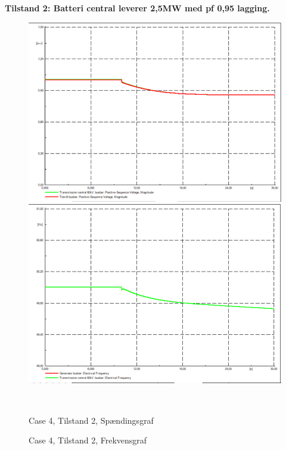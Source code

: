 \textbf{Tilstand 2: Batteri central leverer 2,5MW med pf 0,95 lagging.}
\begin{figure}[H]
	\centering
	\begin{minipage}[b]{0.48\textwidth}
		\centering
		\includegraphics[width=1.00\textwidth]{figurer/LargeDisturbanceBatterypark/Voltage2} %
	\end{minipage}
	\hfill
	\begin{minipage}[b]{0.48\textwidth}
		\centering
		\includegraphics[width=1.00\textwidth]{figurer/LargeDisturbanceBatterypark/Freq2} %
	\end{minipage}
	\\ %
	\begin{minipage}[t]{0.48\textwidth}
		\caption{Case 4, Tilstand 2, Spændingsgraf} %
		\label{fig:C4T2V}
	\end{minipage}
	\hfill
	\begin{minipage}[t]{0.48\textwidth}
		\caption{Case 4, Tilstand 2, Frekvensgraf} %
		\label{fig:C4T2F}
	\end{minipage}
\end{figure}

